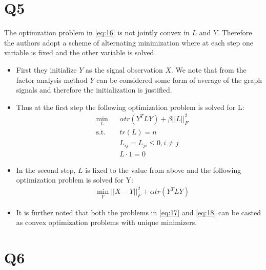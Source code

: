 \documentclass{article}
\begin{document}
\section*{Q5}
The optimzation problem in \ref{eq:16} is not jointly convex in $L$ and $Y$. Therefore the authors adopt a scheme of alternating minimization where at each step one variable is fixed and the other variable is solved.
\begin{itemize}
\item First they initialize $Y$ as the signal observation $X$. We note that from the factor analysis method $Y$ can be considered some form of average of the graph signals and therefore the initialization is justified.
\item Thus at the first step the following optimization problem is solved for L:
  \begin{equation}
    \label{eq:17}
    \begin{aligned}
      & \min_L
      & & \alpha tr(Y^T L Y) + \beta ||L||_F^2 \\
      & \text{s.t.}
      & & tr(L) = n \\
      &&& L_{ij} = L_{ji} \le 0, i \ne j \\
      &&& L \cdot 1 = 0
    \end{aligned}
  \end{equation}
\item In the second step, $L$ is fixed to the value from above and the following optimization problem is solved for Y:
  \begin{equation}
    \label{eq:18}
    \begin{aligned}
      & \min_Y ||X - Y||_F^2 + \alpha tr(Y^T L Y)
    \end{aligned}
  \end{equation}
\item It is further noted that both the problems in \ref{eq:17} and \ref{eq:18} can be casted as convex optimization problems with unique minimizers.
\end{itemize}

\section*{Q6}
\end{document}
